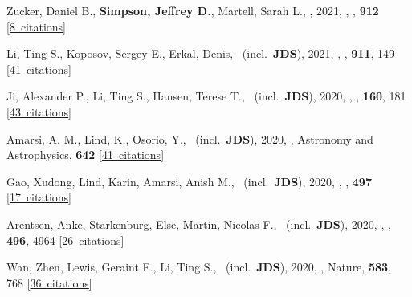\item[{\color{numcolor}\scriptsize53}] Zucker, Daniel B., \textbf{Simpson, Jeffrey D.}, Martell, Sarah L., \etal, 2021, , \apj, \textbf{912} [\href{https://ui.adsabs.harvard.edu/#abs/2021ApJ...912L..30Z}{8~citations}]

\item[{\color{numcolor}\scriptsize52}] Li, Ting S., Koposov, Sergey E., Erkal, Denis, \etal\ (incl.\ \textbf{JDS}), 2021, , \apj, \textbf{911}, 149 [\href{https://ui.adsabs.harvard.edu/#abs/2021ApJ...911..149L}{41~citations}]

\item[{\color{numcolor}\scriptsize51}] Ji, Alexander P., Li, Ting S., Hansen, Terese T., \etal\ (incl.\ \textbf{JDS}), 2020, , \aj, \textbf{160}, 181 [\href{https://ui.adsabs.harvard.edu/#abs/2020AJ....160..181J}{43~citations}]

\item[{\color{numcolor}\scriptsize50}] Amarsi, A. M., Lind, K., Osorio, Y., \etal\ (incl.\ \textbf{JDS}), 2020, , Astronomy and Astrophysics, \textbf{642} [\href{https://ui.adsabs.harvard.edu/#abs/2020A&A...642A..62A}{41~citations}]

\item[{\color{numcolor}\scriptsize49}] Gao, Xudong, Lind, Karin, Amarsi, Anish M., \etal\ (incl.\ \textbf{JDS}), 2020, , \mnras, \textbf{497} [\href{https://ui.adsabs.harvard.edu/#abs/2020MNRAS.497L..30G}{17~citations}]

\item[{\color{numcolor}\scriptsize48}] Arentsen, Anke, Starkenburg, Else, Martin, Nicolas F., \etal\ (incl.\ \textbf{JDS}), 2020, , \mnras, \textbf{496}, 4964 [\href{https://ui.adsabs.harvard.edu/#abs/2020MNRAS.496.4964A}{26~citations}]

\item[{\color{numcolor}\scriptsize47}] Wan, Zhen, Lewis, Geraint F., Li, Ting S., \etal\ (incl.\ \textbf{JDS}), 2020, , Nature, \textbf{583}, 768 [\href{https://ui.adsabs.harvard.edu/#abs/2020Natur.583..768W}{36~citations}]

